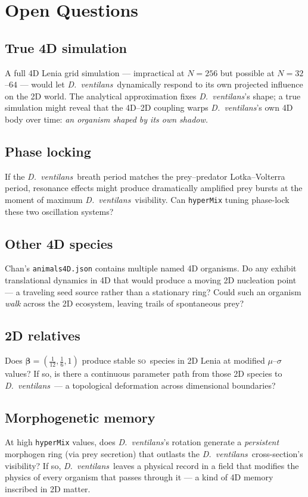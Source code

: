 \documentclass[11pt,a4paper]{article}
\newcommand{\spc}[1]{\textit{#1}}  %
\newcommand{\DV}{\spc{D.\ ventilans}}
\newcommand{\SO}{\textsc{so}}
\begin{document}
\section{Open Questions}

\subsection{True 4D simulation}
A full 4D Lenia grid simulation --- impractical at $N=256$ but possible
at $N=32$–$64$ --- would let \DV\ dynamically respond to its own projected
influence on the 2D world. The analytical approximation fixes \DV's shape;
a true simulation might reveal that the 4D--2D coupling warps \DV's own
4D body over time: \emph{an organism shaped by its own shadow.}

\subsection{Phase locking}
If the \DV\ breath period matches the prey--predator Lotka--Volterra
period, resonance effects might produce dramatically amplified prey
bursts at the moment of maximum \DV\ visibility. Can \texttt{hyperMix}
tuning phase-lock these two oscillation systems?

\subsection{Other 4D species}
Chan's \texttt{animals4D.json} contains multiple named 4D organisms. Do
any exhibit translational dynamics in 4D that would produce a moving 2D
nucleation point --- a traveling seed source rather than a stationary
ring? Could such an organism \emph{walk} across the 2D ecosystem, leaving
trails of spontaneous prey?

\subsection{2D relatives}
Does $\boldsymbol{\beta}=(\tfrac{1}{12},\tfrac{1}{6},1)$ produce stable
\SO\ species in 2D Lenia at modified $\mu$–$\sigma$ values? If so, is
there a continuous parameter path from those 2D species to \DV\ --- a
topological deformation across dimensional boundaries?

\subsection{Morphogenetic memory}
At high \texttt{hyperMix} values, does \DV's rotation generate a
\emph{persistent} morphogen ring (via prey secretion) that outlasts the
\DV\ cross-section's visibility? If so, \DV\ leaves a physical record in
a field that modifies the physics of every organism that passes through
it --- a kind of 4D memory inscribed in 2D matter.
\end{document}
